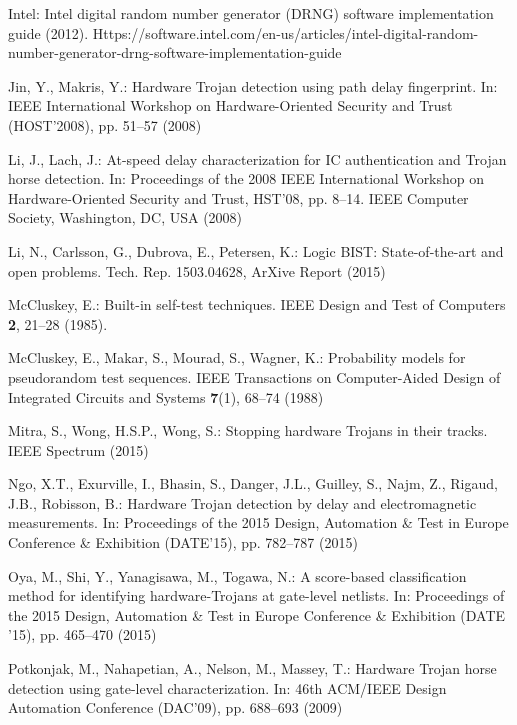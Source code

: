 \documentclass[a4paper]{llncs}
\begin{document}
\begin{thebibliography}{10}
{Intel}: Intel digital random number generator ({DRNG}) software implementation
  guide (2012).
\newblock
  Https://software.intel.com/en-us/articles/intel-digital-random-number-generator-drng-software-implementation-guide

Jin, Y., Makris, Y.: Hardware {T}rojan detection using path delay fingerprint.
\newblock In: IEEE International Workshop on Hardware-Oriented Security and
  Trust (HOST'2008), pp. 51--57 (2008)

Li, J., Lach, J.: At-speed delay characterization for {IC} authentication and
  {T}rojan horse detection.
\newblock In: Proceedings of the 2008 IEEE International Workshop on
  Hardware-Oriented Security and Trust, HST'08, pp. 8--14. IEEE Computer
  Society, Washington, DC, USA (2008)

Li, N., Carlsson, G., Dubrova, E., Petersen, K.: Logic {BIST}: State-of-the-art
  and open problems.
\newblock Tech. Rep. 1503.04628, ArXive Report (2015)

McCluskey, E.: Built-in self-test techniques.
\newblock IEEE Design and Test of Computers \textbf{2}, 21--28 (1985).
\newblock {}

McCluskey, E., Makar, S., Mourad, S., Wagner, K.: Probability models for
  pseudorandom test sequences.
\newblock IEEE Transactions on Computer-Aided Design of Integrated Circuits and
  Systems \textbf{7}(1), 68--74 (1988)

Mitra, S., Wong, H.S.P., Wong, S.: Stopping hardware {T}rojans in their tracks.
\newblock IEEE Spectrum  (2015)

Ngo, X.T., Exurville, I., Bhasin, S., Danger, J.L., Guilley, S., Najm, Z.,
  Rigaud, J.B., Robisson, B.: Hardware {T}rojan detection by delay and
  electromagnetic measurements.
\newblock In: Proceedings of the 2015 Design, Automation \& Test in Europe
  Conference \& Exhibition (DATE'15), pp. 782--787 (2015)

Oya, M., Shi, Y., Yanagisawa, M., Togawa, N.: A score-based classification
  method for identifying hardware-{T}rojans at gate-level netlists.
\newblock In: Proceedings of the 2015 Design, Automation \& Test in Europe
  Conference \& Exhibition (DATE '15), pp. 465--470 (2015)

Potkonjak, M., Nahapetian, A., Nelson, M., Massey, T.: Hardware {T}rojan horse
  detection using gate-level characterization.
\newblock In: 46th ACM/IEEE Design Automation Conference (DAC'09), pp. 688--693
  (2009)


\end{thebibliography}
\end{document}
